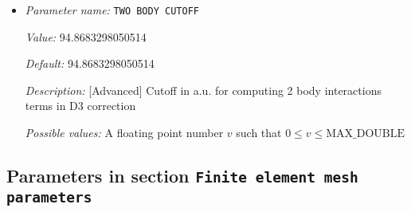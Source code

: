 \begin{itemize}
{\it Value:} 40.0


{\it Default:} 40.0


{\it Description:} [Advanced] Cutoff in a.u. for computing 3 body interactions terms in D3 correction


{\it Possible values:} A floating point number $v$ such that $0 \leq v \leq \text{MAX\_DOUBLE}$
\item {\it Parameter name:} {\tt TWO BODY CUTOFF}
\label{parameters:DFT functional parameters/Dispersion Correction/TWO BODY CUTOFF}
\label{parameters:DFT_20functional_20parameters/Dispersion_20Correction/TWO_20BODY_20CUTOFF}


{\it Value:} 94.8683298050514


{\it Default:} 94.8683298050514


{\it Description:} [Advanced] Cutoff in a.u. for computing 2 body interactions terms in D3 correction


{\it Possible values:} A floating point number $v$ such that $0 \leq v \leq \text{MAX\_DOUBLE}$
\end{itemize}

\subsection{Parameters in section \tt Finite element mesh parameters}
\label{parameters:Finite_20element_20mesh_20parameters}

